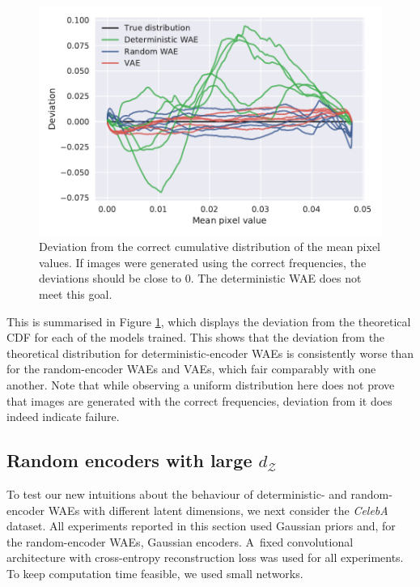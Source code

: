 \documentclass{article}
\def\dZ{d_{\mathcal{Z}}}
\begin{document}
\begin{figure}[t!]
	\centering
	\includegraphics[width=\columnwidth]{fading-square-deviation-from-true-cumulative-distribution}
	\caption{\label{fig:fading-squares-deviation-from-cumulative} Deviation from the correct cumulative distribution of the mean pixel values. If images were generated using the correct frequencies, the deviations should be close to $0$. The deterministic WAE does not meet this goal.}
\end{figure}
This is summarised in Figure \ref{fig:fading-squares-deviation-from-cumulative}, which displays the deviation from the theoretical CDF for each of the models trained. This shows that the deviation from the theoretical distribution for deterministic-encoder WAEs is consistently worse than for the random-encoder WAEs and VAEs, which fair comparably with one another. Note that while observing a uniform distribution here does not prove that images are generated with the correct frequencies, deviation from it does indeed indicate failure.

	

\subsection{\label{subsection:celebA}Random encoders with large $\dZ$}

To test our new intuitions about the behaviour of deterministic- and random-encoder WAEs with different latent dimensions, we next consider the \emph{CelebA} dataset. 
All experiments reported in this section used Gaussian priors and, for the random-encoder WAEs, Gaussian encoders. 
A~fixed convolutional architecture with cross-entropy reconstruction loss was used for all experiments. To keep computation time feasible, we used small networks.
\end{document}
